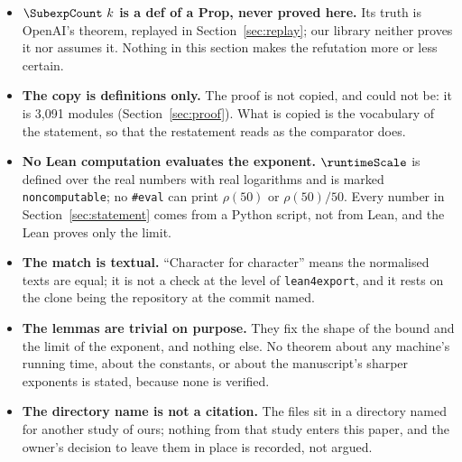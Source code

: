 \begin{itemize}
\item \textbf{\(\SubexpCount\ k\) is a def of a Prop, never proved
  here.} Its truth is OpenAI's theorem, replayed in
  Section~\ref{sec:replay}; our library neither proves it nor assumes
  it. Nothing in this section makes the refutation more or less certain.
\item \textbf{The copy is definitions only.} The proof is not copied,
  and could not be: it is 3,091 modules (Section~\ref{sec:proof}). What
  is copied is the vocabulary of the statement, so that the restatement
  reads as the comparator does.
\item \textbf{No Lean computation evaluates the exponent.}
  $\runtimeScale$ is defined over the real numbers with real logarithms
  and is marked \texttt{noncomputable}; no \texttt{\#eval} can print
  $\rho(50)$ or $\rho(50)/50$. Every number in
  Section~\ref{sec:statement} comes from a Python script, not from
  Lean, and the Lean proves only the limit.
\item \textbf{The match is textual.} ``Character for character'' means
  the normalised texts are equal; it is not a check at the level of
  \texttt{lean4export}, and it rests on the clone being the repository
  at the commit named.
\item \textbf{The lemmas are trivial on purpose.} They fix the shape of
  the bound and the limit of the exponent, and nothing else. No theorem
  about any machine's running time, about the constants, or about the
  manuscript's sharper exponents is stated, because none is verified.
\item \textbf{The directory name is not a citation.} The files sit in a
  directory named for another study of ours; nothing from that study
  enters this paper, and the owner's decision to leave them in place is
  recorded, not argued.
\end{itemize}
\endgroup
